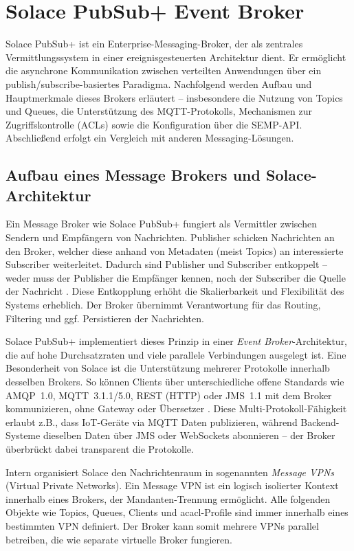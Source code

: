 
\section{Solace PubSub+ Event Broker}
Solace PubSub+ ist ein Enterprise-Messaging-Broker, der als zentrales Vermittlungssystem in einer ereignisgesteuerten Architektur dient. Er ermöglicht die asynchrone Kommunikation zwischen verteilten Anwendungen über ein publish/subscribe-basiertes Paradigma. Nachfolgend werden Aufbau und Hauptmerkmale dieses Brokers erläutert – insbesondere die Nutzung von Topics und Queues, die Unterstützung des MQTT-Protokolls, Mechanismen zur Zugriffskontrolle (ACLs) sowie die Konfiguration über die SEMP-API. Abschließend erfolgt ein Vergleich mit anderen Messaging-Lösungen.

\subsection{Aufbau eines Message Brokers und Solace-Architektur}

Ein Message Broker wie Solace PubSub+ fungiert als Vermittler zwischen Sendern und Empfängern von Nachrichten. Publisher schicken Nachrichten an den Broker, welcher diese anhand von Metadaten (meist Topics) an interessierte Subscriber weiterleitet. Dadurch sind Publisher und Subscriber entkoppelt – weder muss der Publisher die Empfänger kennen, noch der Subscriber die Quelle der Nachricht \cite{Eugster2003}. Diese Entkopplung erhöht die Skalierbarkeit und Flexibilität des Systems erheblich. Der Broker übernimmt Verantwortung für das Routing, Filtering und ggf. Persistieren der Nachrichten.

Solace PubSub+ implementiert dieses Prinzip in einer \textit{Event Broker}-Architektur, die auf hohe Durchsatzraten und viele parallele Verbindungen ausgelegt ist. Eine Besonderheit von Solace ist die Unterstützung mehrerer Protokolle innerhalb desselben Brokers. So können Clients über unterschiedliche offene Standards wie AMQP 1.0, MQTT 3.1.1/5.0, REST (HTTP) oder JMS 1.1 mit dem Broker kommunizieren, ohne Gateway oder Übersetzer \cite{SolaceProtocols}. Diese Multi-Protokoll-Fähigkeit erlaubt z.B., dass IoT-Geräte via MQTT Daten publizieren, während Backend-Systeme dieselben Daten über JMS oder WebSockets abonnieren – der Broker überbrückt dabei transparent die Protokolle.

Intern organisiert Solace den Nachrichtenraum in sogenannten \textit{Message VPNs} (Virtual Private Networks). Ein Message VPN ist ein logisch isolierter Kontext innerhalb eines Brokers, der Mandanten-Trennung ermöglicht. Alle folgenden Objekte wie Topics, Queues, Clients und ac{acl}-Profile sind immer innerhalb eines bestimmten VPN definiert. Der Broker kann somit mehrere VPNs parallel betreiben, die wie separate virtuelle Broker fungieren.

